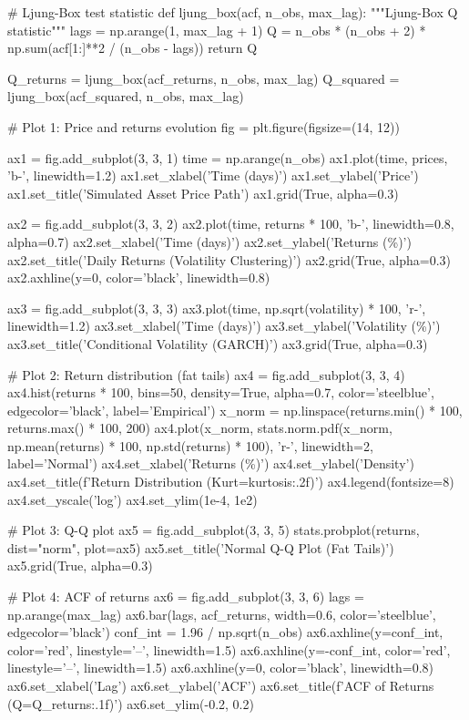 \documentclass[a4paper, 11pt]{article}
\begin{document}
\begin{pycode}
# Ljung-Box test statistic
def ljung_box(acf, n_obs, max_lag):
    """Ljung-Box Q statistic"""
    lags = np.arange(1, max_lag + 1)
    Q = n_obs * (n_obs + 2) * np.sum(acf[1:]**2 / (n_obs - lags))
    return Q

Q_returns = ljung_box(acf_returns, n_obs, max_lag)
Q_squared = ljung_box(acf_squared, n_obs, max_lag)

# Plot 1: Price and returns evolution
fig = plt.figure(figsize=(14, 12))

ax1 = fig.add_subplot(3, 3, 1)
time = np.arange(n_obs)
ax1.plot(time, prices, 'b-', linewidth=1.2)
ax1.set_xlabel('Time (days)')
ax1.set_ylabel('Price')
ax1.set_title('Simulated Asset Price Path')
ax1.grid(True, alpha=0.3)

ax2 = fig.add_subplot(3, 3, 2)
ax2.plot(time, returns * 100, 'b-', linewidth=0.8, alpha=0.7)
ax2.set_xlabel('Time (days)')
ax2.set_ylabel('Returns (\%)')
ax2.set_title('Daily Returns (Volatility Clustering)')
ax2.grid(True, alpha=0.3)
ax2.axhline(y=0, color='black', linewidth=0.8)

ax3 = fig.add_subplot(3, 3, 3)
ax3.plot(time, np.sqrt(volatility) * 100, 'r-', linewidth=1.2)
ax3.set_xlabel('Time (days)')
ax3.set_ylabel('Volatility (\%)')
ax3.set_title('Conditional Volatility (GARCH)')
ax3.grid(True, alpha=0.3)

# Plot 2: Return distribution (fat tails)
ax4 = fig.add_subplot(3, 3, 4)
ax4.hist(returns * 100, bins=50, density=True, alpha=0.7,
         color='steelblue', edgecolor='black', label='Empirical')
x_norm = np.linspace(returns.min() * 100, returns.max() * 100, 200)
ax4.plot(x_norm, stats.norm.pdf(x_norm, np.mean(returns) * 100, np.std(returns) * 100),
         'r-', linewidth=2, label='Normal')
ax4.set_xlabel('Returns (\%)')
ax4.set_ylabel('Density')
ax4.set_title(f'Return Distribution (Kurt={kurtosis:.2f})')
ax4.legend(fontsize=8)
ax4.set_yscale('log')
ax4.set_ylim(1e-4, 1e2)

# Plot 3: Q-Q plot
ax5 = fig.add_subplot(3, 3, 5)
stats.probplot(returns, dist="norm", plot=ax5)
ax5.set_title('Normal Q-Q Plot (Fat Tails)')
ax5.grid(True, alpha=0.3)

# Plot 4: ACF of returns
ax6 = fig.add_subplot(3, 3, 6)
lags = np.arange(max_lag)
ax6.bar(lags, acf_returns, width=0.6, color='steelblue', edgecolor='black')
conf_int = 1.96 / np.sqrt(n_obs)
ax6.axhline(y=conf_int, color='red', linestyle='--', linewidth=1.5)
ax6.axhline(y=-conf_int, color='red', linestyle='--', linewidth=1.5)
ax6.axhline(y=0, color='black', linewidth=0.8)
ax6.set_xlabel('Lag')
ax6.set_ylabel('ACF')
ax6.set_title(f'ACF of Returns (Q={Q_returns:.1f})')
ax6.set_ylim(-0.2, 0.2)


\end{pycode}
\end{document}
